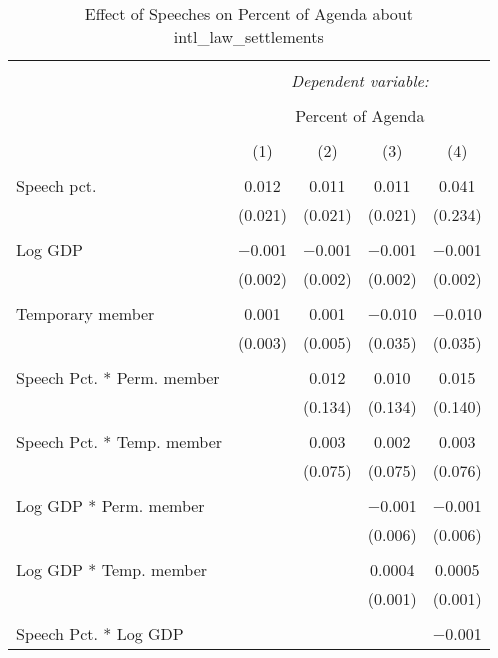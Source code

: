 
\begin{table}[!htbp] \centering 
  \caption{Effect of Speeches on Percent of Agenda about  intl_law_settlements} 
  \label{} 
\begin{tabular}{@{\extracolsep{5pt}}lcccc} 
\\[-1.8ex]\hline 
\hline \\[-1.8ex] 
 & \multicolumn{4}{c}{\textit{Dependent variable:}} \\ 
\cline{2-5} 
\\[-1.8ex] & \multicolumn{4}{c}{Percent of Agenda} \\ 
\\[-1.8ex] & (1) & (2) & (3) & (4)\\ 
\hline \\[-1.8ex] 
 Speech pct. & 0.012 & 0.011 & 0.011 & 0.041 \\ 
  & (0.021) & (0.021) & (0.021) & (0.234) \\ 
  & & & & \\ 
 Log GDP & $-$0.001 & $-$0.001 & $-$0.001 & $-$0.001 \\ 
  & (0.002) & (0.002) & (0.002) & (0.002) \\ 
  & & & & \\ 
 Temporary member & 0.001 & 0.001 & $-$0.010 & $-$0.010 \\ 
  & (0.003) & (0.005) & (0.035) & (0.035) \\ 
  & & & & \\ 
 Speech Pct. * Perm. member &  & 0.012 & 0.010 & 0.015 \\ 
  &  & (0.134) & (0.134) & (0.140) \\ 
  & & & & \\ 
 Speech Pct. * Temp. member &  & 0.003 & 0.002 & 0.003 \\ 
  &  & (0.075) & (0.075) & (0.076) \\ 
  & & & & \\ 
 Log GDP * Perm. member &  &  & $-$0.001 & $-$0.001 \\ 
  &  &  & (0.006) & (0.006) \\ 
  & & & & \\ 
 Log GDP * Temp. member &  &  & 0.0004 & 0.0005 \\ 
  &  &  & (0.001) & (0.001) \\ 
  & & & & \\ 
 Speech Pct. * Log GDP &  &  &  & $-$0.001 \\ 

\end{tabular}
\end{table}
